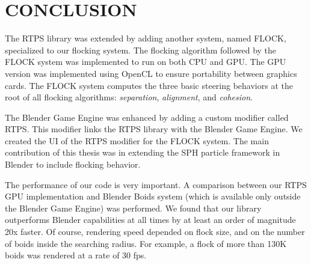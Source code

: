 \chapter{CONCLUSION}\label{conclusionChapter}


The RTPS library was extended by adding another system, named FLOCK, specialized to our flocking system. The flocking algorithm followed by the FLOCK system was implemented to run on both CPU and GPU. The GPU version was implemented using OpenCL to ensure portability between graphics cards. The FLOCK system computes the three basic steering behaviors at the root of all flocking algorithms: \textit{separation}, \textit{alignment}, and \textit{cohesion}. 

The Blender Game Engine was enhanced by adding a custom modifier called RTPS. This modifier links the RTPS library with the Blender Game Engine. We created the UI of the RTPS modifier for the FLOCK system. The main contribution of this thesis was in extending the SPH particle framework in Blender to include flocking behavior.   

The performance of our code is very important. A comparison between our RTPS GPU implementation and Blender Boids system (which is available only outside the Blender Game Engine) was performed. We found that our library outperforms Blender capabilities at all times by at least an order of magnitude 20x faster. Of course, rendering speed depended on flock size, and on the number of boids inside the searching radius. For example, a flock of more than 130K boids was rendered at a rate of 30 fps.
